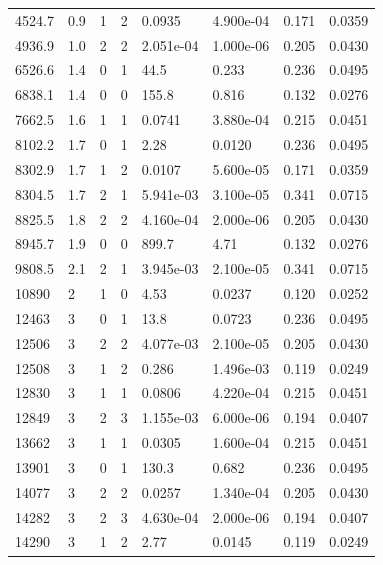 \documentclass[preview]{standalone}
\begin{document}
{{\begin{tabular}{L{1.2cm}C{1.2cm} C{0.3cm}C{0.5cm} C{1.4cm}C{1.4cm} C{1.4cm}C{1.4cm}}
  4524.7  &   0.9  & 1     &  2 &  0.0935  & 4.900e-04  & 0.171 &  0.0359   \\ 
  4936.9  &   1.0  & 2     &  2 &  2.051e-04  & 1.000e-06  & 0.205 &  0.0430   \\ 
  6526.6  &   1.4  & 0     &  1 &  44.5  & 0.233  & 0.236 &  0.0495   \\ 
  6838.1  &   1.4  & 0     &  0 &  155.8  & 0.816  & 0.132 &  0.0276   \\ 
  7662.5  &   1.6  & 1     &  1 &  0.0741  & 3.880e-04  & 0.215 &  0.0451   \\ 
  8102.2  &   1.7  & 0     &  1 &  2.28  & 0.0120  & 0.236 &  0.0495   \\ 
  8302.9  &   1.7  & 1     &  2 &  0.0107  & 5.600e-05  & 0.171 &  0.0359   \\ 
  8304.5  &   1.7  & 2     &  1 &  5.941e-03  & 3.100e-05  & 0.341 &  0.0715   \\ 
  8825.5  &   1.8  & 2     &  2 &  4.160e-04  & 2.000e-06  & 0.205 &  0.0430   \\ 
  8945.7  &   1.9  & 0     &  0 &  899.7  & 4.71  & 0.132 &  0.0276   \\ 
  9808.5  &   2.1  & 2     &  1 &  3.945e-03  & 2.100e-05  & 0.341 &  0.0715   \\ 
  10890  &     2  & 1     &  0 &  4.53  & 0.0237  & 0.120 &  0.0252   \\ 
  12463  &     3  & 0     &  1 &  13.8  & 0.0723  & 0.236 &  0.0495   \\ 
  12506  &     3  & 2     &  2 &  4.077e-03  & 2.100e-05  & 0.205 &  0.0430   \\ 
  12508  &     3  & 1     &  2 &  0.286  & 1.496e-03  & 0.119 &  0.0249   \\ 
  12830  &     3  & 1     &  1 &  0.0806  & 4.220e-04  & 0.215 &  0.0451   \\ 
  12849  &     3  & 2     &  3 &  1.155e-03  & 6.000e-06  & 0.194 &  0.0407   \\ 
  13662  &     3  & 1     &  1 &  0.0305  & 1.600e-04  & 0.215 &  0.0451   \\ 
  13901  &     3  & 0     &  1 &  130.3  & 0.682  & 0.236 &  0.0495   \\ 
  14077  &     3  & 2     &  2 &  0.0257  & 1.340e-04  & 0.205 &  0.0430   \\ 
  14282  &     3  & 2     &  3 &  4.630e-04  & 2.000e-06  & 0.194 &  0.0407   \\ 
  14290  &     3  & 1     &  2 &  2.77  & 0.0145  & 0.119 &  0.0249   \\ 

\end{tabular}}}
\end{document}
